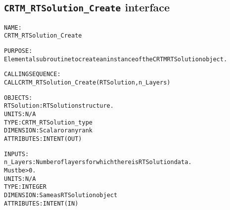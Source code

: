 \subsection{\texttt{CRTM\_RTSolution\_Create} interface}
  \label{sec:CRTM_RTSolution_Create_interface}
  \begin{alltt}
 
  NAME:
        CRTM_RTSolution_Create
 
  PURPOSE:
        Elemental subroutine to create an instance of the CRTM RTSolution object.
 
  CALLING SEQUENCE:
        CALL CRTM_RTSolution_Create( RTSolution, n_Layers )
 
  OBJECTS:
        RTSolution:   RTSolution structure.
                      UNITS:      N/A
                      TYPE:       CRTM_RTSolution_type
                      DIMENSION:  Scalar or any rank
                      ATTRIBUTES: INTENT(OUT)
 
  INPUTS:
        n_Layers:     Number of layers for which there is RTSolution data.
                      Must be > 0.
                      UNITS:      N/A
                      TYPE:       INTEGER
                      DIMENSION:  Same as RTSolution object
                      ATTRIBUTES: INTENT(IN)
 
  \end{alltt}
